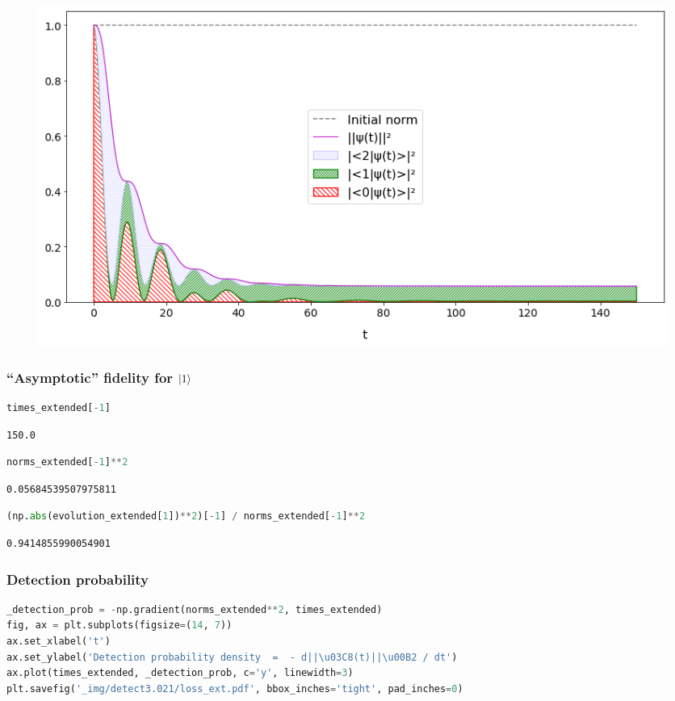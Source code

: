 \begin{figure}[h!]
\centering
\includegraphics[width=0.66\linewidth]{tex/appendix/nb/jupyter/3lev/output_40_0.png}

\end{figure}

\hypertarget{asymptotic-fidelity-for-1}{%
\subsubsection*{``Asymptotic'' fidelity for $\ket{1}$}\label{asymptotic-fidelity-for-1}}

\begin{lstlisting}[language=Python]
times_extended[-1]
\end{lstlisting}

\begin{lstlisting}
150.0
\end{lstlisting}

\begin{lstlisting}[language=Python]
norms_extended[-1]**2
\end{lstlisting}

\begin{lstlisting}
0.05684539507975811
\end{lstlisting}

\begin{lstlisting}[language=Python]
(np.abs(evolution_extended[1])**2)[-1] / norms_extended[-1]**2
\end{lstlisting}

\begin{lstlisting}
0.9414855990054901
\end{lstlisting}

\hypertarget{detection-probability}{%
\subsubsection{Detection probability}\label{detection-probability}}

\begin{lstlisting}[language=Python]
_detection_prob = -np.gradient(norms_extended**2, times_extended)
fig, ax = plt.subplots(figsize=(14, 7))
ax.set_xlabel('t')
ax.set_ylabel('Detection probability density  =  - d||\u03C8(t)||\u00B2 / dt')
ax.plot(times_extended, _detection_prob, c='y', linewidth=3)
plt.savefig('_img/detect3.021/loss_ext.pdf', bbox_inches='tight', pad_inches=0)
\end{lstlisting}

